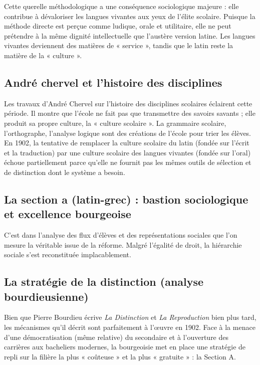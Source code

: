 Cette querelle méthodologique a une conséquence sociologique majeure : elle contribue à dévaloriser
les langues vivantes aux yeux de l'élite scolaire. Puisque la méthode directe est perçue comme
ludique, orale et utilitaire, elle ne peut prétendre à la même dignité intellectuelle que l'austère
version latine. Les langues vivantes deviennent des matières de « service », tandis que le latin
reste la matière de la « culture ».\cite{I-2-1-ref8}



\subsection{André chervel et l'histoire des disciplines}

Les travaux d'André Chervel sur l'histoire des disciplines scolaires éclairent cette période. Il
montre que l'école ne fait pas que transmettre des savoirs savants ; elle produit sa propre culture,
la « culture scolaire ».\cite{I-2-1-ref21} La grammaire scolaire, l'orthographe, l'analyse logique
sont des créations de l'école pour trier les élèves. En 1902, la tentative de remplacer la culture
scolaire du latin (fondée sur l'écrit et la traduction) par une culture scolaire des langues
vivantes (fondée sur l'oral) échoue partiellement parce qu'elle ne fournit pas les mêmes outils de
sélection et de distinction dont le système a besoin.



\subsection{La section a (latin-grec) : bastion sociologique et excellence bourgeoise}

C'est dans l'analyse des flux d'élèves et des représentations sociales que l'on mesure la véritable
issue de la réforme. Malgré l'égalité de droit, la hiérarchie sociale s'est reconstituée
implacablement.



\subsection{La stratégie de la distinction (analyse bourdieusienne)}

Bien que Pierre Bourdieu écrive \textit{La Distinction} et \textit{La Reproduction} bien plus tard,
les mécanismes qu'il décrit sont parfaitement à l'œuvre en 1902.\cite{I-2-1-ref23} Face à la menace
d'une démocratisation (même relative) du secondaire et à l'ouverture des carrières aux bacheliers
modernes, la bourgeoisie met en place une stratégie de repli sur la filière la plus « coûteuse » et
la plus « gratuite » : la Section A.

